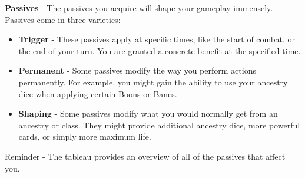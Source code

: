 \textbf{Passives} - The passives you acquire will shape your gameplay immensely. Passives come in three varieties: 

\begin{itemize}
	\item \textbf{Trigger} - These passives apply at specific times, like the start of combat, or the end of your turn. You are granted a concrete benefit at the specified time.
	\item \textbf{Permanent} - Some passives modify the way you perform actions permanently. For example, you might gain the ability to use your ancestry dice when applying certain Boons or Banes.
	\item \textbf{Shaping} - Some passives modify what you would normally get from an ancestry or class. They might provide additional ancestry dice, more powerful cards, or simply more maximum life.
\end{itemize}

\begin{tcolorbox}[colframe=blue, colback=white]
	Reminder -	The tableau provides an overview of all of the passives that affect you.
\end{tcolorbox}